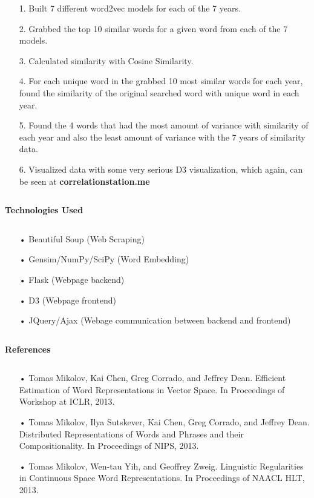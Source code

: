 \documentclass[ruled]{article}
\begin{document}
\begin{itemize}
\item[1.  ]Built 7 different word2vec models for each of the 7 years.
\item[2.  ]Grabbed the top 10 similar words for a given word from each of the 7 models.
\item[3.  ]Calculated similarity with Cosine Similarity.
\item[4.  ]For each unique word in the grabbed 10 most similar words for each year, found the similarity of the original searched word with unique word in each year.
\item[5.  ]Found the 4 words that had the most amount of variance with similarity of each year and also the least amount of variance with the 7 years of similarity data.
\item[6.  ]Visualized data with some very serious D3 visualization, which again, can be seen at \textbf{correlationstation.me}

\end{itemize}
\noindent\makebox[\linewidth]{\rule{\paperwidth}{0.4pt}}
\begin{verbatim}

\end{verbatim}
\begin{center}
{\Large \textbf{ Technologies Used } }
\end{center}
\begin{verbatim}

\end{verbatim}
\begin{itemize}
\item[•] Beautiful Soup (Web Scraping)
\item[•] Gensim/NumPy/SciPy (Word Embedding)
\item[•] Flask (Webpage backend)
\item[•] D3 (Webpage frontend)
\item[•] JQuery/Ajax (Webage communication between backend and frontend)

\end{itemize}
\noindent\makebox[\linewidth]{\rule{\paperwidth}{0.4pt}}
\begin{verbatim}

\end{verbatim}
\begin{center}
{\Large \textbf{ References} }
\end{center}
\begin{verbatim}

\end{verbatim}
\begin{itemize}
\item[•] Tomas Mikolov, Kai Chen, Greg Corrado, and Jeffrey Dean. Efficient Estimation of Word Representations in Vector Space. In Proceedings of Workshop at ICLR, 2013.
\item[•] Tomas Mikolov, Ilya Sutskever, Kai Chen, Greg Corrado, and Jeffrey Dean. Distributed Representations of Words and Phrases and their Compositionality. In Proceedings of NIPS, 2013.
\item[•] Tomas Mikolov, Wen-tau Yih, and Geoffrey Zweig. Linguistic Regularities in Continuous Space Word Representations. In Proceedings of NAACL HLT, 2013.
\end{itemize}
\end{document}

